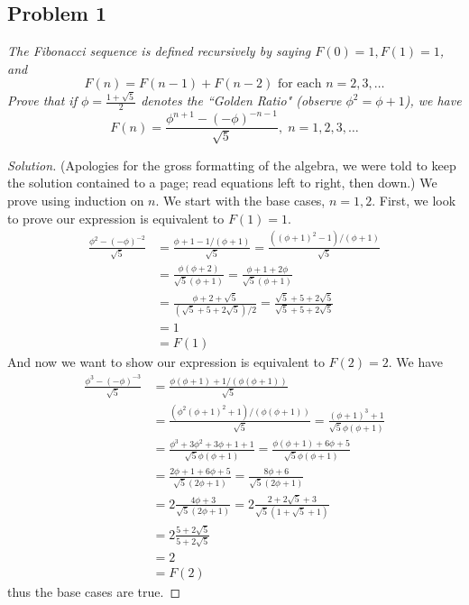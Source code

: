 \documentclass{article}
\begin{document}
\subsection*{Problem 1}
{\it  The Fibonacci sequence is defined recursively by saying $F(0) = 1, F(1) = 1$, and
\[F(n) = F(n-1) + F(n-2) \text{ for each }n=2,3,\dots\]
Prove that if $\phi=\frac{1+\sqrt{5}}{2}$ denotes the ``Golden Ratio"
(observe $\phi^2 = \phi + 1$), we have
\[F(n) = \frac{\phi^{n+1}-(-\phi)^{-n-1}}{\sqrt{5}}, \; n=1,2,3,\dots\]}

\begin{proof}[Solution]\let\qed\relax
	(Apologies for the gross formatting of the algebra,
	we were told to keep the solution contained to a page;
	read equations left to right, then down.)
	We prove using induction on $n$.
	We start with the base cases, $n = 1,2$.
	First, we look to prove our expression is equivalent to $F(1) = 1$.
	\begin{align*}
		\frac{\phi^2-(-\phi)^{-2}}{\sqrt{5}}
		&= \frac{\phi + 1 - 1/(\phi+1)}{\sqrt{5}}
		= \frac{((\phi+1)^2-1)/(\phi+1)}{\sqrt{5}}\\
		&= \frac{\phi(\phi+2)}{\sqrt{5}(\phi+1)}
		= \frac{\phi+1 + 2\phi}{\sqrt{5}(\phi+1)}\\
		&= \frac{\phi + 2 + \sqrt{5}}{(\sqrt{5}+5+2\sqrt{5})/2}
		= \frac{\sqrt{5} + 5 + 2\sqrt{5}}{\sqrt{5} + 5 + 2\sqrt{5}}\\
		&= 1\\ &= F(1)
	\end{align*}
	And now we want to show our expression is equivalent to $F(2) = 2$.
	We have
\begin{align*}
	\frac{\phi^3 - (-\phi)^{-3}}{\sqrt{5}}
	&= \frac{\phi(\phi+1) + 1/(\phi(\phi+1))}{\sqrt{5}}\\
	&= \frac{(\phi^2(\phi+1)^2 + 1)/(\phi(\phi+1))}{\sqrt{5}}
	= \frac{(\phi+1)^3 + 1}{\sqrt{5}\phi(\phi+1)}\\
	&= \frac{\phi^3 + 3\phi^2 + 3\phi + 1 + 1}{\sqrt{5}\phi(\phi+1)}
	= \frac{\phi(\phi+1) + 6\phi + 5}{\sqrt{5}\phi(\phi+1)}\\
	&= \frac{2\phi + 1 + 6\phi + 5}{\sqrt{5}(2\phi + 1)}
	= \frac{8\phi + 6}{\sqrt{5}(2\phi + 1)}\\
	&= 2\frac{4\phi + 3}{\sqrt{5}(2\phi+1)}
	= 2\frac{2 + 2\sqrt{5} + 3}{\sqrt{5}(1+\sqrt{5}+1)}\\
	&= 2\frac{5 + 2\sqrt{5}}{5 + 2\sqrt{5}}\\
	&= 2\\ &= F(2)
\end{align*}
thus the base cases are true.


\end{proof}
\end{document}
